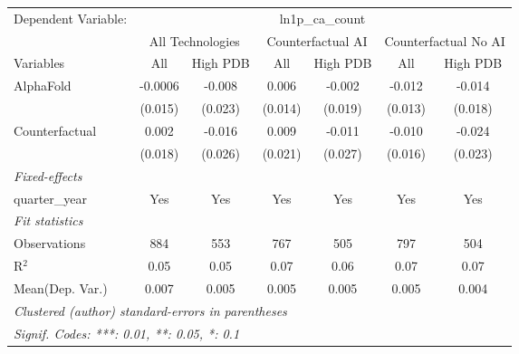 \begingroup
\centering
\begin{tabular}{lcccccc}
   \tabularnewline \midrule \midrule
   Dependent Variable: & \multicolumn{6}{c}{ln1p\_ca\_count}\\
 & \multicolumn{2}{c}{All Technologies} & \multicolumn{2}{c}{Counterfactual AI} & \multicolumn{2}{c}{Counterfactual No AI} \\
\cmidrule(lr){1-1}\cmidrule(lr){2-3} \cmidrule(lr){4-5} \cmidrule(lr){6-7}
Variables & \multicolumn{1}{c}{All} & \multicolumn{1}{c}{High PDB} & \multicolumn{1}{c}{All} & \multicolumn{1}{c}{High PDB} & \multicolumn{1}{c}{All} & \multicolumn{1}{c}{High PDB} \\
\cmidrule(lr){1-1}\cmidrule(lr){2-2} \cmidrule(lr){3-3} \cmidrule(lr){4-4} \cmidrule(lr){5-5} \cmidrule(lr){6-6} \cmidrule(lr){7-7}
   AlphaFold      & -0.0006 & -0.008  & 0.006   & -0.002  & -0.012  & -0.014\\   
                  & (0.015) & (0.023) & (0.014) & (0.019) & (0.013) & (0.018)\\   
   Counterfactual & 0.002   & -0.016  & 0.009   & -0.011  & -0.010  & -0.024\\   
                  & (0.018) & (0.026) & (0.021) & (0.027) & (0.016) & (0.023)\\   
   \midrule
   \emph{Fixed-effects}\\
   quarter\_year  & Yes     & Yes     & Yes     & Yes     & Yes     & Yes\\  
   \midrule
   \emph{Fit statistics}\\
   Observations   & 884     & 553     & 767     & 505     & 797     & 504\\  
   R$^2$          & 0.05    & 0.05    & 0.07    & 0.06    & 0.07    & 0.07\\  
Mean(Dep. Var.) & 0.007 & 0.005 & 0.005 & 0.005 & 0.005 & 0.004 \\
   \midrule \midrule
   \multicolumn{7}{l}{\emph{Clustered (author) standard-errors in parentheses}}\\
   \multicolumn{7}{l}{\emph{Signif. Codes: ***: 0.01, **: 0.05, *: 0.1}}\\
\end{tabular}
\par\endgroup
